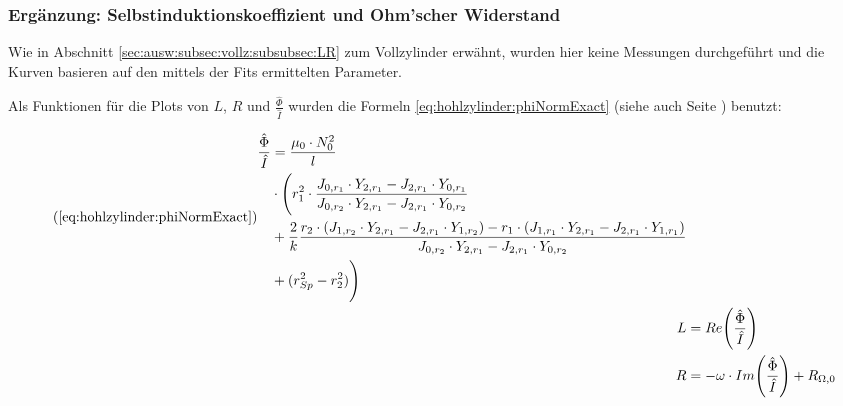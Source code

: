 \begin{figure}[h!]
    \resizebox{\textwidth}{!}{}
\end{figure}



\begin{figure}[h!]
    \resizebox{\textwidth}{!}{}
\end{figure}



\begin{figure}[h!]
    \resizebox{\textwidth}{!}{}
\end{figure}



\clearpage
\subsubsection{Erg\"anzung: Selbstinduktionskoeffizient und Ohm'scher Widerstand}
\label{sec:ausw:subsec:hohlz:st:subsubsec:LR}

Wie  in  Abschnitt \ref{sec:ausw:subsec:vollz:subsubsec:LR}  zum  Vollzylinder
erw\"ahnt, wurden hier keine Messungen  durchgef\"uhrt und die Kurven basieren
auf den mittels der Fits ermittelten Parameter.

Als Funktionen f\"ur  die Plots von $L$,  $R$ und $\frac{\hat{\Phi}}{\hat{I}}$
wurden  die  Formeln   \ref{eq:hohlzylinder:phiNormExact}  (siehe  auch  Seite
\pageref{eq:hohlzylinder:phiNormExact}) benutzt:

\begin{align*}
    \tag{\ref{eq:hohlzylinder:phiNormExact}}
    \begin{split}
    \frac{\hat{\Phi}}{\hat{I}} & = \frac{\mu_0 \cdot N_0^2}{l} \\
                               & \cdot \Biggl( r_1^2 \cdot \frac{J_{0,r_1} \cdot Y_{2,r_1} - J_{2,r_1} \cdot Y_{0,r_1}}{J_{0,r_2} \cdot Y_{2,r_1} - J_{2,r_1} \cdot Y_{0,r_2}} \\
                               & + \frac{2}{k} \frac{r_2 \cdot (J_{1,r_2} \cdot Y_{2,r_1} - J_{2,r_1} \cdot Y_{1,r_2}) - r_1 \cdot (J_{1,r_1} \cdot Y_{2,r_1} - J_{2,r_1} \cdot Y_{1,r_1})}{J_{0,r_2} \cdot Y_{2,r_1} - J_{2,r_1} \cdot Y_{0,r_2}} \\
                               & + (r_{Sp}^2 - r_2^2) \Biggr)
    \end{split} \\
    L & = Re \Biggl(\frac{\hat{\Phi}}{\hat{I}} \Biggr) \\
    R & = - \omega \cdot Im \Biggl(\frac{\hat{\Phi}}{\hat{I}} \Biggr) + R_{\Omega,0}
\end{align*}

